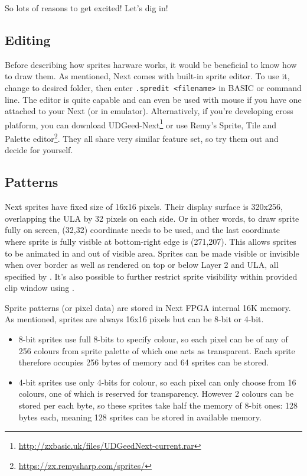 \documentclass[12pt,twoside,openright,a4paper]{book}
\begin{document}
So lots of reasons to get excited! Let's dig in!

\subsection{Editing}

Before describing how sprites harware works, it would be beneficial to know how to draw them. As mentioned, Next comes with built-in sprite editor. To use it, change to desired folder, then enter {\tt .spredit <filename>} in BASIC or command line. The editor is quite capable and can even be used with mouse if you have one attached to your Next (or in emulator). Alternatively, if you're developing cross platform, you can download UDGeed-Next\footnote{\url{http://zxbasic.uk/files/UDGeedNext-current.rar}} or use Remy's Sprite, Tile and Palette editor\footnote{\url{https://zx.remysharp.com/sprites/}}. They all share very similar feature set, so try them out and decide for yourself.


\subsection{Patterns}

Next sprites have fixed size of 16x16 pixels. Their display surface is 320x256, overlapping the ULA by 32 pixels on each side. Or in other words, to draw sprite fully on screen, (32,32) coordinate needs to be used, and the last coordinate where sprite is fully visible at bottom-right edge is (271,207). This allows sprites to be animated in and out of visible area. Sprites can be made visible or invisible when over border as well as rendered on top or below Layer 2 and ULA, all specified by . It's also possible to further restrict sprite visibility within provided clip window using .

Sprite patterns (or pixel data) are stored in Next FPGA internal 16K memory. As mentioned, sprites are always 16x16 pixels but can be 8-bit or 4-bit.

\begin{itemize}[topsep=1pt,itemsep=1pt]
	\item 8-bit sprites use full 8-bits to specify colour, so each pixel can be of any of 256 colours from sprite palette of which one acts as transparent. Each sprite therefore occupies 256 bytes of memory and 64 sprites can be stored.

	\item 4-bit sprites use only 4-bits for colour, so each pixel can only choose from 16 colours, one of which is reserved for transparency. However 2 colours can be stored per each byte, so these sprites take half the memory of 8-bit ones: 128 bytes each, meaning 128 sprites can be stored in available memory.
\end{itemize}
\end{document}
